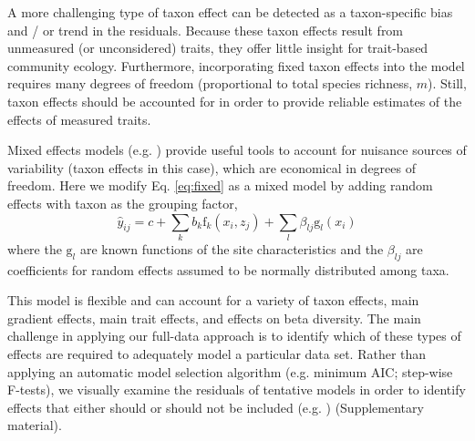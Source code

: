 \documentclass[12pt]{ecology}
\begin{document}
A more challenging type of taxon effect can be detected as a taxon-specific bias and / or trend in the residuals.  Because these taxon effects result from unmeasured (or unconsidered) traits, they offer little insight for trait-based community ecology.  Furthermore, incorporating fixed taxon effects into the model requires many degrees of freedom (proportional to total species richness, $m$).  Still, taxon effects should be accounted for in order to provide reliable estimates of the effects of measured traits.

Mixed effects models (e.g. ) provide useful tools to account for nuisance sources of variability (taxon effects in this case), which are economical in degrees of freedom.  Here we modify Eq. \ref{eq:fixed} as a mixed model by adding random effects with taxon as the grouping factor,
\begin{equation}
\hat{y}_{ij} = c + 
	\sum_k b_k \mathrm{f}_k (x_i, z_j) + 
	\sum_l \beta_{lj} \mathrm{g}_l (x_i)
\end{equation}
where the $\mathrm{g}_l$ are known functions of the site characteristics and the $\beta_{lj}$ are coefficients for random effects assumed to be normally distributed among taxa.

This model is flexible and can account for a variety of taxon effects, main gradient effects, main trait effects, and effects on beta diversity.  The main challenge in applying our full-data approach is to identify which of these types of effects are required to adequately model a particular data set.  Rather than applying an automatic model selection algorithm (e.g. minimum AIC; step-wise F-tests), we visually examine the residuals of tentative models in order to identify effects that either should or should not be included (e.g. ) (Supplementary material).
\end{document}
